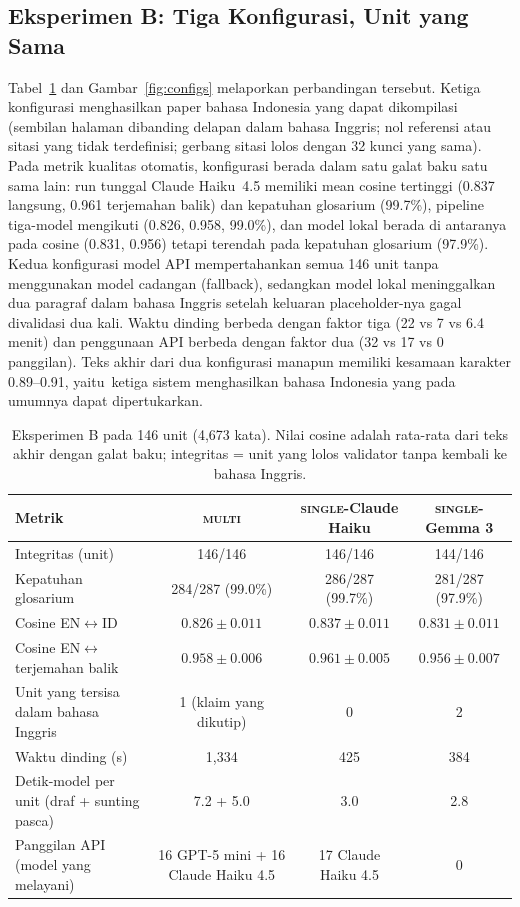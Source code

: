 \subsection{Eksperimen B: Tiga Konfigurasi, Unit yang Sama}
Tabel~\ref{tab:results} dan Gambar~\ref{fig:configs} melaporkan perbandingan tersebut. Ketiga konfigurasi menghasilkan paper bahasa Indonesia yang dapat dikompilasi (sembilan halaman dibanding delapan dalam bahasa Inggris; nol referensi atau sitasi yang tidak terdefinisi; gerbang sitasi lolos dengan 32 kunci yang sama). Pada metrik kualitas otomatis, konfigurasi berada dalam satu galat baku satu sama lain: run tunggal Claude Haiku~4.5 memiliki mean cosine tertinggi (0.837 langsung, 0.961 terjemahan balik) dan kepatuhan glosarium (99.7\%), pipeline tiga-model mengikuti (0.826, 0.958, 99.0\%), dan model lokal berada di antaranya pada cosine (0.831, 0.956) tetapi terendah pada kepatuhan glosarium (97.9\%). Kedua konfigurasi model API mempertahankan semua 146 unit tanpa menggunakan model cadangan (fallback), sedangkan model lokal meninggalkan dua paragraf dalam bahasa Inggris setelah keluaran placeholder-nya gagal divalidasi dua kali. Waktu dinding berbeda dengan faktor tiga (22 vs 7 vs 6.4 menit) dan penggunaan API berbeda dengan faktor dua (32 vs 17 vs 0 panggilan). Teks akhir dari dua konfigurasi manapun memiliki kesamaan karakter 0.89--0.91, yaitu\ ketiga sistem menghasilkan bahasa Indonesia yang pada umumnya dapat dipertukarkan.

\begin{table}[t]
  \caption{Eksperimen B pada 146 unit (4{,}673 kata). Nilai cosine adalah rata-rata dari teks akhir dengan galat baku; integritas = unit yang lolos validator tanpa kembali ke bahasa Inggris.}
  \label{tab:results}
  \centering
  \footnotesize
  \begin{tabular}{@{}lccc@{}}
    \toprule
    Metrik & \textsc{multi} & \textsc{single}-Claude Haiku & \textsc{single}-Gemma 3 \\
    \midrule
    Integritas (unit) & 146/146 & 146/146 & 144/146 \\
    Kepatuhan glosarium & 284/287 (99.0\%) & 286/287 (99.7\%) & 281/287 (97.9\%) \\
    Cosine EN$\leftrightarrow$ID & $0.826\pm0.011$ & $0.837\pm0.011$ & $0.831\pm0.011$ \\
    Cosine EN$\leftrightarrow$terjemahan balik & $0.958\pm0.006$ & $0.961\pm0.005$ & $0.956\pm0.007$ \\
    Unit yang tersisa dalam bahasa Inggris & 1 (klaim yang dikutip) & 0 & 2 \\
    Waktu dinding (s) & 1{,}334 & 425 & 384 \\
    Detik-model per unit (draf + sunting pasca) & 7.2 + 5.0 & 3.0 & 2.8 \\
    Panggilan API (model yang melayani) & 16 GPT-5 mini + 16 Claude Haiku 4.5 & 17 Claude Haiku 4.5 & 0 \\
    \bottomrule
  \end{tabular}
\end{table}

